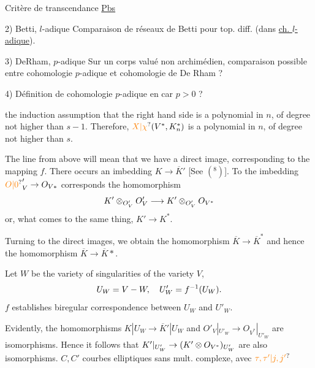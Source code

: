 Critère de transcendance
\uline{Pbs}



2) Betti, $l$-adique  Comparaison de réseaux de Betti pour top. diff.
(dans \uline{ch. $l$-adique}).

3) DeRham, $p$-adique \quad Sur un corps valué  non archimédien,
comparaison possible entre cohomologie $p$-adique et
cohomologie de De Rham ?

4) Définition de cohomologie $p$-adique en car $p>0$ ?

the induction assumption that the right hand side is a polynomial in $n$, of degree not higher than $s-1$. Therefore, $\unsure{X|\chi}(V^*,K_n^*)$ is a polynomial in $n$, of degree not higher than $s$.

The line from above will mean that we have a direct image, corresponding to the mapping $f$. There occurs an imbedding $K\to\overline K'$ [See $({}^{8})$]. To the imbedding $\unsure{O|0}'_V\to O_{V*}$ corresponds the homomorphism
\[
K'\otimes_{O'_V}O'_V\longrightarrow K'\otimes_{O'_V}O_{V^{*}}
\]
or, what comes to the same thing, $K'\to K^*$.

Turning to the direct images, we obtain the homomorphism $\overline K\to\overline K^*$ and hence the homomorphism $\overline K\to\overline K{*}$.

Let $W$ be the variety of singularities of the variety $V$,
\[
U_W=V-W,\quad U'_W=f^{-1}(U_W).
\]
$f$ establishes biregular correspondence between $U_W$ and $U'_W$.

Evidently, the homomorphisms $K|U_W\to\overline K'|U_W$ and $O'_V|_{U'_W}\to O_{V^{*}}|_{U'_W}$ are isomorphisms. Hence it follows that $K'|_{U'_W}\to(K'\otimes O_{V^{*}})_{U'_W}$ are also isomorphisms.
$C,C'$ courbes elliptiques sans mult. complexe, avec $\unsure{\tau,\tau'|j,j'}$ 

